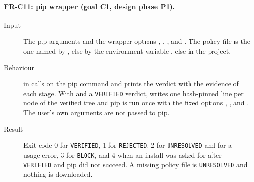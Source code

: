 \paragraph{FR-C11: pip wrapper (goal C1, design phase P1).}
\begin{sloppypar}
\begin{description}
    \item[Input] The pip arguments and the wrapper options , , ,  and . The policy file is the one named by , else by the environment variable , else  in the project.
    \item[Behaviour]  in  calls  on the pip command and prints the verdict with the evidence of each stage. With  and a \texttt{VERIFIED} verdict,  writes one hash-pinned line per node of the verified tree and pip is run once with the fixed options , ,  and . The user's own arguments are not passed to pip.
    \item[Result] Exit code 0 for \texttt{VERIFIED}, 1 for \texttt{REJECTED}, 2 for \texttt{UNRESOLVED} and for a usage error, 3 for \texttt{BLOCK}, and 4 when an install was asked for after \texttt{VERIFIED} and pip did not succeed. A missing policy file is \texttt{UNRESOLVED} and nothing is downloaded.
\end{description}
\end{sloppypar}

